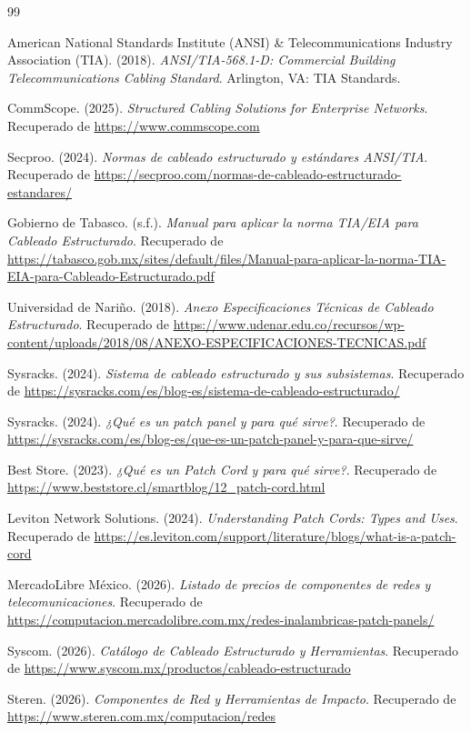 \documentclass[a4paper,12pt]{article}
\begin{document}
\newpage

\begin{thebibliography}{99}

American National Standards Institute (ANSI) \& Telecommunications Industry Association (TIA). (2018). \textit{ANSI/TIA-568.1-D: Commercial Building Telecommunications Cabling Standard}. Arlington, VA: TIA Standards.

CommScope. (2025). \textit{Structured Cabling Solutions for Enterprise Networks}. Recuperado de \url{https://www.commscope.com}

Secproo. (2024). \textit{Normas de cableado estructurado y estándares ANSI/TIA}. Recuperado de \url{https://secproo.com/normas-de-cableado-estructurado-estandares/}

Gobierno de Tabasco. (s.f.). \textit{Manual para aplicar la norma TIA/EIA para Cableado Estructurado}. Recuperado de \url{https://tabasco.gob.mx/sites/default/files/Manual-para-aplicar-la-norma-TIA-EIA-para-Cableado-Estructurado.pdf}

Universidad de Nariño. (2018). \textit{Anexo Especificaciones Técnicas de Cableado Estructurado}. Recuperado de \url{https://www.udenar.edu.co/recursos/wp-content/uploads/2018/08/ANEXO-ESPECIFICACIONES-TECNICAS.pdf}

Sysracks. (2024). \textit{Sistema de cableado estructurado y sus subsistemas}. Recuperado de \url{https://sysracks.com/es/blog-es/sistema-de-cableado-estructurado/}

Sysracks. (2024). \textit{¿Qué es un patch panel y para qué sirve?}. Recuperado de \url{https://sysracks.com/es/blog-es/que-es-un-patch-panel-y-para-que-sirve/}

Best Store. (2023). \textit{¿Qué es un Patch Cord y para qué sirve?}. Recuperado de \url{https://www.beststore.cl/smartblog/12\_patch-cord.html}

Leviton Network Solutions. (2024). \textit{Understanding Patch Cords: Types and Uses}. Recuperado de \url{https://es.leviton.com/support/literature/blogs/what-is-a-patch-cord}

MercadoLibre México. (2026). \textit{Listado de precios de componentes de redes y telecomunicaciones}. Recuperado de \url{https://computacion.mercadolibre.com.mx/redes-inalambricas-patch-panels/}

Syscom. (2026). \textit{Catálogo de Cableado Estructurado y Herramientas}. Recuperado de \url{https://www.syscom.mx/productos/cableado-estructurado}

Steren. (2026). \textit{Componentes de Red y Herramientas de Impacto}. Recuperado de \url{https://www.steren.com.mx/computacion/redes}

\end{thebibliography}
\end{document}
